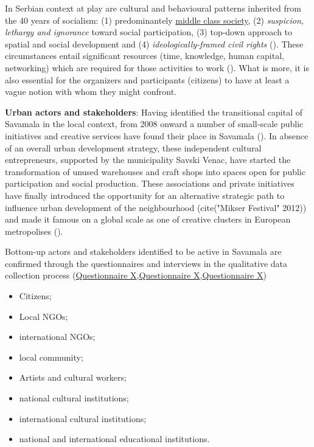 \documentclass[11pt]{report}
\begin{document}
\begin{itemize}
In Serbian context at play are cultural and behavioural patterns inherited from the 40 years of socialism:
(1) predominantely \underline{middle class society},
(2) \textit{suspicion, lethargy and ignorance} toward social participation,
(3) top-down approach to spatial and social development and
(4) \textit{ideologically-framed civil rights} (\href{ref}{\citealt{bolay_instrumental_2014}}).
These circumstances entail significant resources (time, knowledge, human capital, networking) which are required  for those activities to work (\href{ref}{\citealt{ministarstvo_prostora_urbani_2014}}).
What is more, it is also essential for the organizers and participants (citizens) to have at least a vague notion with whom they might confront.

\textbf{Urban actors and stakeholders}:
Having identified the transitional capital of Savamala in the local context, from 2008 onward a number of small-scale public initiatives and creative services have found their place in Savamala (\href{ref}{\citealt{cvetinovic_engine_2013}}).
In absence of an overall urban development strategy, these independent cultural entrepreneurs, supported by the municipality Savski Venac, have started the transformation of unused warehouses and craft shops into spaces open for public participation and social production.
These associations and private initiatives have finally introduced the opportunity for an alternative strategic path to influence urban development of the neighbourhood (cite{("Mikser Festival" 2012)}) and made it famous on a global scale as one of creative clusters in European metropolises (\cite{ref Monocle, Gardian?}).

Bottom-up actors and stakeholders identified to be active in Savamala are confirmed through the questionnaires and interviews in the qualitative data collection process (\href{Questionnaire Experts Post-socialist}{Questionnaire X},\href{Questionnaire Experts Savamala}{Questionnaire X},\href{Questionnaire Students Savamala}{Questionnaire X})

\begin{itemize}
\item Citizens;
\item Local NGOs;
\item international NGOs;
\item local community;
\item Artists and cultural workers;
\item national cultural institutions;
\item international cultural institutions;
\item national and international educational institutions.
\end{itemize}


\end{itemize}
\end{document}
